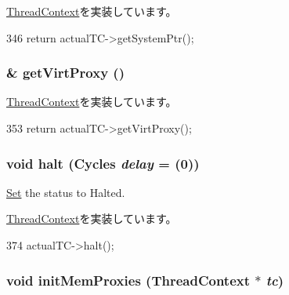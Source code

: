 \hyperlink{classThreadContext_a4585cb7174e215741001b70fafe6662e}{ThreadContext}を実装しています。


\begin{DoxyCode}
346 { return actualTC->getSystemPtr(); }
\end{DoxyCode}
\hypertarget{classProxyThreadContext_ac7399661f9073ba4ec121b87c782924b}{
\subsubsection[{getVirtProxy}]{\& getVirtProxy ()}}
\label{classProxyThreadContext_ac7399661f9073ba4ec121b87c782924b}


\hyperlink{classThreadContext_a55e3a4b93d5f1ad641247f6d223191c6}{ThreadContext}を実装しています。


\begin{DoxyCode}
353 { return actualTC->getVirtProxy(); }
\end{DoxyCode}
\hypertarget{classProxyThreadContext_ade40686c5cdae8911d4062b9bf3d5340}{
\subsubsection[{halt}]{\setlength{\rightskip}{0pt plus 5cm}void halt ({\bf Cycles} {\em delay} = {(0)})}}
\label{classProxyThreadContext_ade40686c5cdae8911d4062b9bf3d5340}


\hyperlink{classSet}{Set} the status to Halted. 

\hyperlink{classThreadContext_a1cf6e868fcd49300a04acd0cae4fd142}{ThreadContext}を実装しています。


\begin{DoxyCode}
374 { actualTC->halt(); }
\end{DoxyCode}
\hypertarget{classProxyThreadContext_ab24719c7923d7d57030fa05bb166c62c}{
\subsubsection[{initMemProxies}]{\setlength{\rightskip}{0pt plus 5cm}void initMemProxies ({\bf ThreadContext} $\ast$ {\em tc})}}
\label{classProxyThreadContext_ab24719c7923d7d57030fa05bb166c62c}



